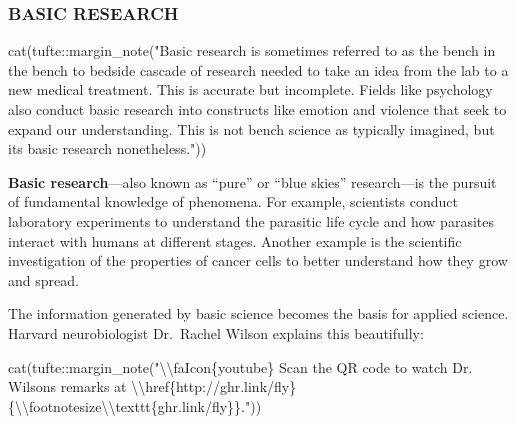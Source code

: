 \documentclass[
  letterpaper,
  DIV=11,
  numbers=noendperiod,
  oneside]{scrartcl}
\newenvironment{Shaded}{\begin{snugshade}}{\end{snugshade}}
\newcommand{\FunctionTok}[1]{\textcolor[rgb]{0.28,0.35,0.67}{#1}}
\newcommand{\NormalTok}[1]{\textcolor[rgb]{0.00,0.23,0.31}{#1}}
\newcommand{\SpecialCharTok}[1]{\textcolor[rgb]{0.37,0.37,0.37}{#1}}
\newcommand{\StringTok}[1]{\textcolor[rgb]{0.13,0.47,0.30}{#1}}
\begin{document}
\hypertarget{basic-research}{%
\subsubsection*{BASIC RESEARCH}\label{basic-research}}

\begin{Shaded}
\begin{Highlighting}[]
\FunctionTok{cat}\NormalTok{(tufte}\SpecialCharTok{::}\FunctionTok{margin\_note}\NormalTok{(}\StringTok{"Basic research is sometimes referred to as the \textquotesingle{}bench\textquotesingle{} in the \textquotesingle{}bench to bedside\textquotesingle{} cascade of research needed to take an idea from the lab to a new medical treatment. This is accurate but incomplete. Fields like psychology also conduct basic research into constructs like emotion and violence that seek to expand our understanding. This is not \textquotesingle{}bench science\textquotesingle{} as typically imagined, but it\textquotesingle{}s basic research nonetheless."}\NormalTok{))}
\end{Highlighting}
\end{Shaded}


\textbf{Basic research}---also known as ``pure'' or ``blue skies''
research---is the pursuit of fundamental knowledge of phenomena. For
example, scientists conduct laboratory experiments to understand the
parasitic life cycle and how parasites interact with humans at different
stages. Another example is the scientific investigation of the
properties of cancer cells to better understand how they grow and
spread.

The information generated by basic science becomes the basis for applied
science. Harvard neurobiologist Dr.~Rachel Wilson explains this
beautifully:

\begin{Shaded}
\begin{Highlighting}[]
\FunctionTok{cat}\NormalTok{(tufte}\SpecialCharTok{::}\FunctionTok{margin\_note}\NormalTok{(}\StringTok{"}\SpecialCharTok{\textbackslash{}\textbackslash{}}\StringTok{faIcon\{youtube\} Scan the QR code to watch Dr. Wilson\textquotesingle{}s remarks at }\SpecialCharTok{\textbackslash{}\textbackslash{}}\StringTok{href\{http://ghr.link/fly\}\{}\SpecialCharTok{\textbackslash{}\textbackslash{}}\StringTok{footnotesize}\SpecialCharTok{\textbackslash{}\textbackslash{}}\StringTok{texttt\{ghr.link/fly\}\}."}\NormalTok{))}
\end{Highlighting}
\end{Shaded}
\end{document}
